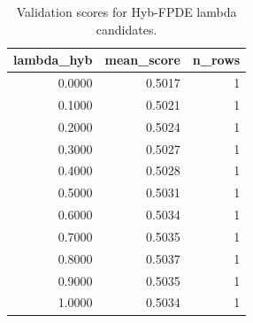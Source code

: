 \begin{table}[t]
\caption{Validation scores for Hyb-FPDE lambda candidates.}
\label{tab:lambda_distribution_computed}
\centering
\begin{tabular}{rrr}
\toprule
lambda\_hyb & mean\_score & n\_rows \\
\midrule
0.0000 & 0.5017 & 1 \\
0.1000 & 0.5021 & 1 \\
0.2000 & 0.5024 & 1 \\
0.3000 & 0.5027 & 1 \\
0.4000 & 0.5028 & 1 \\
0.5000 & 0.5031 & 1 \\
0.6000 & 0.5034 & 1 \\
0.7000 & 0.5035 & 1 \\
0.8000 & 0.5037 & 1 \\
0.9000 & 0.5035 & 1 \\
1.0000 & 0.5034 & 1 \\
\bottomrule
\end{tabular}

\end{table}
